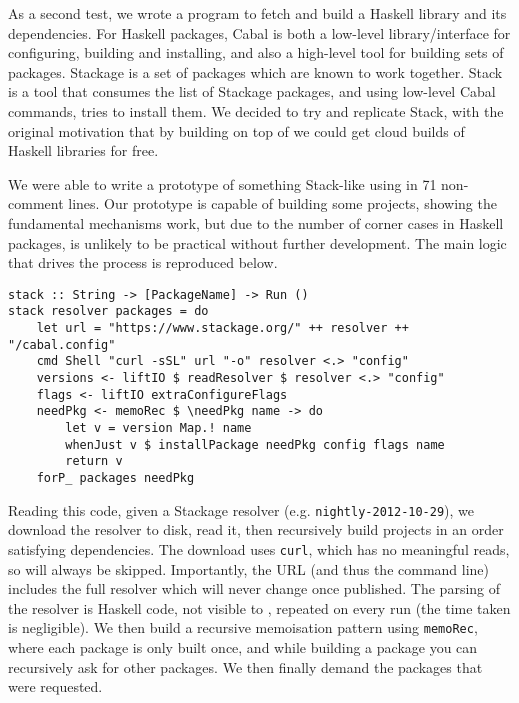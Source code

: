 As a second test, we wrote a program to fetch and build a Haskell library and its dependencies. For Haskell packages, Cabal is both a low-level library/interface for configuring, building and installing, and also a high-level tool for building sets of packages. Stackage is a set of packages which are known to work together. Stack is a tool that consumes the list of Stackage packages, and using low-level Cabal commands, tries to install them. We decided to try and replicate Stack, with the original motivation that by building on top of \Rattle we could get cloud builds of Haskell libraries for free.

We were able to write a prototype of something Stack-like using \Rattle in 71 non-comment lines. Our prototype is capable of building some projects, showing the fundamental mechanisms work, but due to the number of corner cases in Haskell packages, is unlikely to be practical without further development. The main logic that drives the process is reproduced below.

\begin{small}
\begin{verbatim}
stack :: String -> [PackageName] -> Run ()
stack resolver packages = do
    let url = "https://www.stackage.org/" ++ resolver ++ "/cabal.config"
    cmd Shell "curl -sSL" url "-o" resolver <.> "config"
    versions <- liftIO $ readResolver $ resolver <.> "config"
    flags <- liftIO extraConfigureFlags
    needPkg <- memoRec $ \needPkg name -> do
        let v = version Map.! name
        whenJust v $ installPackage needPkg config flags name
        return v
    forP_ packages needPkg
\end{verbatim}
\end{small}

Reading this code, given a Stackage resolver (e.g. \texttt{nightly-2012-10-29}), we download the resolver to disk, read it, then recursively build projects in an order satisfying dependencies. The download uses \texttt{curl}, which has no meaningful reads, so will always be skipped. Importantly, the URL (and thus the command line) includes the full resolver which will never change once published. The parsing of the resolver is Haskell code, not visible to \Rattle, repeated on every run (the time taken is negligible). We then build a recursive memoisation pattern using \texttt{memoRec}, where each package is only built once, and while building a package you can recursively ask for other packages. We then finally demand the packages that were requested. %

